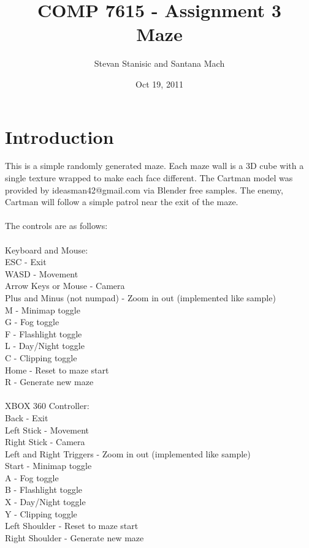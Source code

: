\documentclass[titlepage]{article}
\begin{document}
\author{Stevan Stanisic and Santana Mach}
\title{COMP 7615 - Assignment 3 \\ Maze}
\date{Oct 19, 2011}
\maketitle{}

\pagebreak

\section{Introduction}

This is a simple randomly generated maze. Each maze wall is a 3D cube with a single texture wrapped to make each face different.
The Cartman model was provided by ideasman42@gmail.com via Blender free samples.  The enemy, Cartman will follow a simple patrol near the exit of the maze.
\\
\\
The controls are as follows: \\
\\
Keyboard and Mouse: \\
ESC - Exit \\
WASD - Movement \\
Arrow Keys or Mouse - Camera \\
Plus and Minus (not numpad) - Zoom in out (implemented like sample) \\
M - Minimap toggle \\
G - Fog toggle \\
F - Flashlight toggle \\
L - Day/Night toggle \\
C - Clipping toggle \\
Home - Reset to maze start \\
R - Generate new maze \\
\\
XBOX 360 Controller: \\
Back - Exit \\
Left Stick - Movement \\
Right Stick - Camera \\
Left and Right Triggers - Zoom in out (implemented like sample) \\
Start - Minimap toggle \\
A - Fog toggle \\
B - Flashlight toggle \\
X - Day/Night toggle \\
Y - Clipping toggle \\
Left Shoulder - Reset to maze start \\
Right Shoulder - Generate new maze \\
\end{document}

